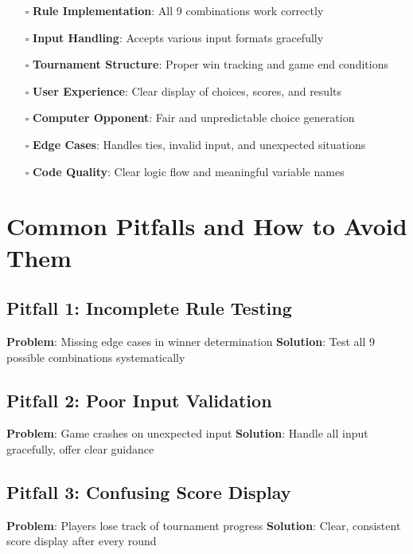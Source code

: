 \documentclass[
  letterpaper,
  DIV=11,
  numbers=noendperiod,
  oneside]{scrreprt}
\providecommand{\tightlist}{%
  \setlength{\itemsep}{0pt}\setlength{\parskip}{0pt}}\usepackage{longtable,booktabs,array}
\begin{document}
\begin{itemize}
\tightlist
\item[$\square$]
  \textbf{Rule Implementation}: All 9 combinations work correctly
\item[$\square$]
  \textbf{Input Handling}: Accepts various input formats gracefully
\item[$\square$]
  \textbf{Tournament Structure}: Proper win tracking and game end
  conditions
\item[$\square$]
  \textbf{User Experience}: Clear display of choices, scores, and
  results
\item[$\square$]
  \textbf{Computer Opponent}: Fair and unpredictable choice generation
\item[$\square$]
  \textbf{Edge Cases}: Handles ties, invalid input, and unexpected
  situations
\item[$\square$]
  \textbf{Code Quality}: Clear logic flow and meaningful variable names
\end{itemize}

\section{Common Pitfalls and How to Avoid
Them}\label{common-pitfalls-and-how-to-avoid-them-3}

\subsection{Pitfall 1: Incomplete Rule
Testing}\label{pitfall-1-incomplete-rule-testing}

\textbf{Problem}: Missing edge cases in winner determination
\textbf{Solution}: Test all 9 possible combinations systematically

\subsection{Pitfall 2: Poor Input
Validation}\label{pitfall-2-poor-input-validation}

\textbf{Problem}: Game crashes on unexpected input \textbf{Solution}:
Handle all input gracefully, offer clear guidance

\subsection{Pitfall 3: Confusing Score
Display}\label{pitfall-3-confusing-score-display}

\textbf{Problem}: Players lose track of tournament progress
\textbf{Solution}: Clear, consistent score display after every round
\end{document}
